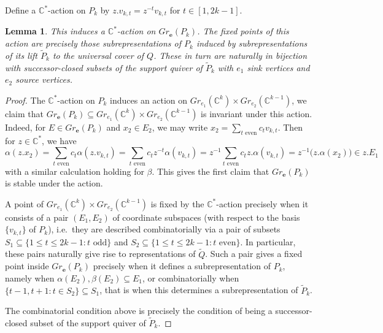 \documentclass{amsart}
\newtheorem{lemma}[theorem]{Lemma}
\numberwithin{equation}{section}
\newcommand{\CC}{\mathbb{C}}
\newcommand{\bfe}{\mathbf{e}}
\begin{document}
  Define a $\CC^*$-action on $P_k$ by $z.v_{k,t}=z^{-t}v_{k,t}$ for $t\in[1,2k-1]$.
  \begin{lemma}
    This induces a $\CC^*$-action on $Gr_\bfe(P_k)$.
    The fixed points of this action are precisely those subrepresentations of $P_k$ induced by subrepresentations of its lift $\widetilde P_k$ to the universal cover of $Q$.
    These in turn are naturally in bijection with successor-closed subsets of the support quiver of $\widetilde P_k$ with $e_1$ sink vertices and $e_2$ source vertices.
  \end{lemma}
  \begin{proof}
    The $\CC^*$-action on $P_k$ induces an action on $Gr_{e_1}(\CC^k)\times Gr_{e_2}(\CC^{k-1})$, we claim that $Gr_\bfe(P_k)\subseteq Gr_{e_1}(\CC^k)\times Gr_{e_2}(\CC^{k-1})$ is invariant under this action.
    Indeed, for $E\in Gr_\bfe(P_k)$ and $x_2\in E_2$, we may write $x_2=\sum\limits_{\text{$t$ even}} c_t v_{k,t}$.
    Then for $z\in\CC^*$, we have 
    \[\alpha(z.x_2)=\sum\limits_{\text{$t$ even}} c_t \alpha(z.v_{k,t})=\sum\limits_{\text{$t$ even}} c_t z^{-t}\alpha(v_{k,t})=z^{-1}\sum\limits_{\text{$t$ even}} c_t z.\alpha(v_{k,t})=z^{-1} \big(z.\alpha(x_2)\big)\in z.E_1\]
    with a similar calculation holding for $\beta$.
    This gives the first claim that $Gr_\bfe(P_k)$ is stable under the action.

    A point of $Gr_{e_1}(\CC^k)\times Gr_{e_2}(\CC^{k-1})$ is fixed by the $\CC^*$-action precisely when it consists of a pair $(E_1,E_2)$ of coordinate subspaces (with respect to the basis $\{v_{k,t}\}$ of $P_k$), i.e.\ they are described combinatorially via a pair of subsets $S_1\subseteq\{1\le t\le 2k-1:\text{$t$ odd}\}$ and $S_2\subseteq\{1\le t\le 2k-1:\text{$t$ even}\}$.
    In particular, these pairs naturally give rise to representations of $\widetilde Q$.
    Such a pair gives a fixed point inside $Gr_\bfe(P_k)$ precisely when it defines a subrepresentation of $P_k$, namely when $\alpha(E_2),\beta(E_2)\subseteq E_1$, or combinatorially when $\{t-1,t+1:t\in S_2\}\subseteq S_1$, that is when this determines a subrepresentation of $\widetilde P_k$.

    The combinatorial condition above is precisely the condition of being a successor-closed subset of the support quiver of $\widetilde P_k$.
  \end{proof}
  
\end{document}
